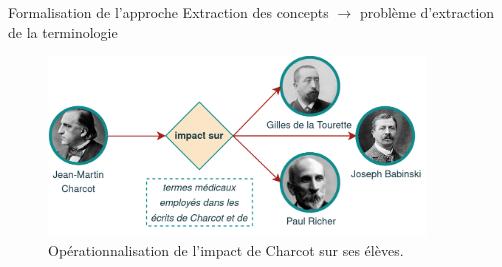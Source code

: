 \begin{frame}{Formalisation de l'approche}
	Extraction des concepts $\rightarrow$ problème d’extraction de la terminologie
	\begin{figure}[!h]
		\centering
		\includegraphics[width=100mm,scale=0.5]{pic/charcot_intertextualite.png}
		\caption{Opérationnalisation de l'impact de Charcot sur ses élèves.}
		\label{fig:my_label}
	\end{figure}
\end{frame}


